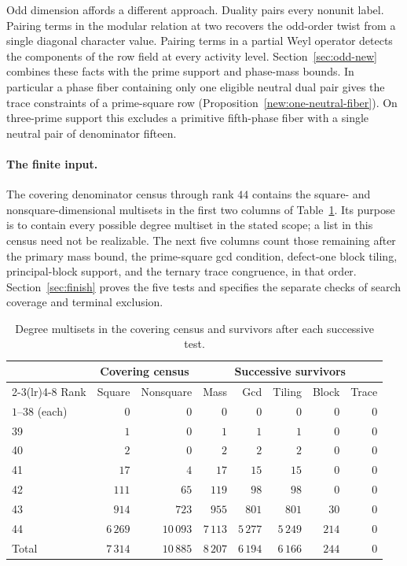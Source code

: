 \documentclass[11pt]{amsart}
\numberwithin{equation}{section}
\theoremstyle{definition}
\theoremstyle{plain}
\begin{document}
Odd dimension affords a different approach. Duality pairs every nonunit label. Pairing terms in the modular relation at two recovers the odd-order twist from a single diagonal character value. Pairing terms in a partial Weyl operator detects the components of the row field at every activity level. Section~\ref{sec:odd-new} combines these facts with the prime support and phase-mass bounds. In particular a phase fiber containing only one eligible neutral dual
pair gives the trace constraints of a prime-square row (Proposition~\ref{new:one-neutral-fiber}).
On three-prime support this excludes a primitive fifth-phase fiber with a
single neutral pair of denominator fifteen.

\paragraph{The finite input.}
The covering denominator census through rank $44$ contains the square-
and nonsquare-dimensional multisets in the first two columns of
Table~\ref{tab:counts}. Its purpose is to contain every possible degree
multiset in the stated scope; a list in this census need not be
realizable. The next five columns count those remaining
after the primary mass bound, the prime-square gcd condition, defect-one
block tiling, principal-block support, and the ternary trace congruence,
in that order. Section~\ref{sec:finish} proves the five tests and
specifies the separate checks of search coverage and terminal exclusion.

\begin{table}[htbp]
\caption{Degree multisets in the covering census and survivors after each successive test.}
\label{tab:counts}
\centering\footnotesize\setlength{\tabcolsep}{5.3pt}
\begin{tabular}{@{}lrrrrrrr@{}}\toprule
 & \multicolumn{2}{c}{Covering census} & \multicolumn{5}{c}{Successive survivors} \\
\cmidrule(lr){2-3}\cmidrule(lr){4-8}
Rank & Square & Nonsquare & Mass & Gcd & Tiling & Block & Trace \\ \midrule
$1$--$38$ (each) & $0$ & $0$ & $0$ & $0$ & $0$ & $0$ & $0$ \\
39 & $1$ & $0$ & $1$ & $1$ & $1$ & $0$ & $0$ \\
40 & $2$ & $0$ & $2$ & $2$ & $2$ & $0$ & $0$ \\
41 & $17$ & $4$ & $17$ & $15$ & $15$ & $0$ & $0$ \\
42 & $111$ & $65$ & $119$ & $98$ & $98$ & $0$ & $0$ \\
43 & $914$ & $723$ & $955$ & $801$ & $801$ & $30$ & $0$ \\
44 & $6\,269$ & $10\,093$ & $7\,113$ & $5\,277$ & $5\,249$ & $214$ & $0$ \\
\midrule Total & $7\,314$ & $10\,885$ & $8\,207$ & $6\,194$ & $6\,166$ & $244$ & $0$ \\
\bottomrule
\end{tabular}
\end{table}
\end{document}
